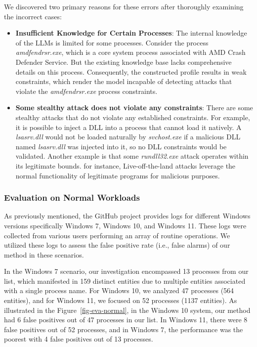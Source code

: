 We discovered two primary reasons for these errors after thoroughly examining the incorrect cases:
\begin{itemize}
    \item \textbf{Insufficient Knowledge for Certain Processes}:  The internal knowledge of the LLMs is limited for some processes. Consider the process \textit{amdfendrsr.exe}, which is a core system process associated with AMD Crash Defender Service. But the existing knowledge base lacks comprehensive details on this process. Consequently, the constructed profile results in weak constraints, which render the model incapable of detecting attacks that violate the \textit{amdfendrsr.exe} process constraints.
    \item \textbf{Some stealthy attack does not violate any constraints}: There are some stealthy attacks that do not violate any established constraints. For example, it is possible to inject a DLL into a process that cannot load it natively. A \textit{lsasrv.dll} would not be loaded naturally by \textit{svchost.exe} if a malicious DLL named \textit{lsasrv.dll} was injected into it, so no DLL constraints would be validated. Another example is that some \textit{rundll32.exe} attack operates within its legitimate bounds. for instance, Live-off-the-land\cite{barr2021survivalism} attacks leverage the normal functionality of legitimate programs for malicious purposes.
\end{itemize}

\subsubsection{Evaluation on Normal Workloads}
As previously mentioned, the GitHub project \cite{evtx-baseline2022} provides logs for different Windows versions specifically Windows 7, Windows 10, and Windows 11. 
These logs were collected from various users performing an array of routine operations. We utilized these logs to assess the false positive rate (i.e., false alarms) of our method in these scenarios.

In the Windows 7 scenario, our investigation encompassed 13 processes from our list, which manifested in 159 distinct entities due to multiple entities associated with a single process name. For Windows 10, we analyzed 47 processes (564 entities), and for Windows 11, we focused on 52 processes (1137 entities).
As illustrated in the Figure~\ref{fig-eva-normal}, in the Windows 10 system, our method had 6 false positives out of 47 processes in our list. In Windows 11, there were 8 false positives out of 52 processes, and in Windows 7, the performance was the poorest with 4 false positives out of 13 processes.

